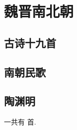 \documentclass[twocolumn]{ctexart}
\newcommand{\二号}{\fontsize{21pt}{\baselineskip}\selectfont}%
\newcommand{\三号}{\fontsize{15.75pt}{\baselineskip}\selectfont}
\newcommand{\四号}{\fontsize{14pt}{\baselineskip}\selectfont}
\newcounter{poetrycounterall} %
\newcounter{poetrycounter}[section] %
\newcounter{poetrycountersub}[subsection] %
\begin{document}
\tableofcontents   

\newpage

\clearpage
\section{魏晋南北朝}
\subsection{古诗十九首}

\subsection{南朝民歌}

\subsection{陶渊明}



% 
% 
% 
% 
% 




% 
% 
% 
% 
% 
% 
% 
% 
% 





% 
% 
% 
% 







% 
% 
% 

一共有 \thepoetrycounterall 首.
\end{document}
